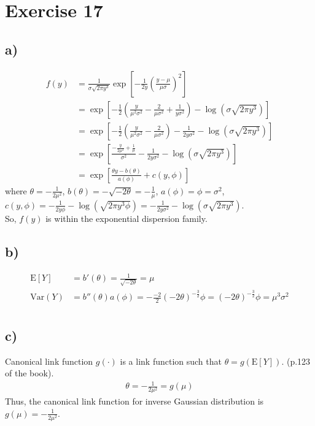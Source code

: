 \documentclass[a4paper]{article}
\newcommand{\E}{\mathrm{E}}
\newcommand{\Var}{\mathrm{Var}}
\begin{document}
\vspace{\baselineskip}
\section{Exercise 17}
\subsection{a)}

\begin{align*}
f(y) &= \frac{1}{\sigma\sqrt{2\pi y^{3}}}\exp\left[-\frac{1}{2y}\left(\frac{y-\mu}{\mu\sigma}\right)^{2}\right]\\
&= \exp\left[-\frac{1}{2}\left(\frac{y}{\mu^{2}\sigma^{2}} -\frac{2}{\mu\sigma^{2}} + \frac{1}{y\sigma^{2}}\right) -\log\left(\sigma\sqrt{2\pi y^{3}}\right)\right]\\
&= \exp\left[-\frac{1}{2}\left(\frac{y}{\mu^{2}\sigma^{2}} -\frac{2}{\mu\sigma^{2}}\right) -\frac{1}{2y\sigma^{2}} -\log\left(\sigma\sqrt{2\pi y^{3}}\right)\right]\\
&= \exp\left[\frac{-\frac{y}{2\mu^{2}} +\frac{1}{\mu}}{\sigma^{2}} -\frac{1}{2y\sigma^{2}} -\log\left(\sigma\sqrt{2\pi y^{3}}\right)\right]\\
&= \exp\left[\frac{\theta y - b(\theta)}{a(\phi)} + c(y,\phi)\right]
\end{align*}
where $\theta = -\frac{1}{2\mu^{2}}$, $b(\theta) = -\sqrt{-2\theta}  = -\frac{1}{\mu}$, $a(\phi) = \phi = \sigma^{2}$, $c(y,\phi) = -\frac{1}{2y\phi} -\log\left(\sqrt{2\pi y^{3}\phi}\right) = -\frac{1}{2y\sigma^{2}} -\log\left(\sigma\sqrt{2\pi y^{3}}\right)$.\\
So, $f(y)$ is within the exponential dispersion family.\\


\subsection{b)}
\begin{align*}
\E[Y] &= b'(\theta) = \frac{1}{\sqrt{-2\theta}} = \mu\\
\Var(Y) &= b''(\theta)a(\phi) = -\frac{-2}{2}(-2\theta)^{-\frac{3}{2}}\phi = (-2\theta)^{-\frac{3}{2}}\phi = \mu^{3}\sigma^{2}\\
\end{align*}


\subsection{c)}
Canonical link function $g(\cdot)$ is a link function such that $\theta = g\left(\E[Y] \right)$. (p.123 of the book).
\begin{align*}
\theta = -\frac{1}{2\mu^{2}} = g(\mu)
\end{align*}
Thus, the canonical link function for inverse Gaussian distribution is $g(\mu) = -\frac{1}{2\mu^{2}}$.
\end{document}
